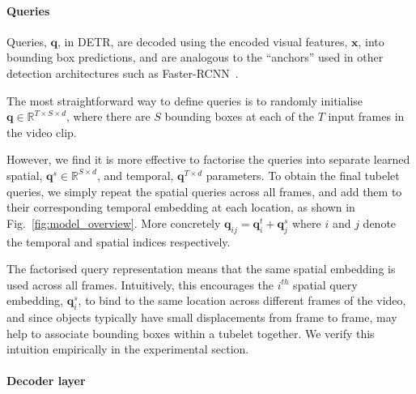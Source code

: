\documentclass[10pt,twocolumn,letterpaper]{article}
\def \paravspace {-0.7\baselineskip}
\begin{document}
\paragraph{Queries}
\label{sec:method_queries}

Queries, $\mathbf{q}$, in DETR, are decoded using the encoded visual features, $\mathbf{x}$, into bounding box predictions, and are analogous to the ``anchors'' used in other detection architectures such as Faster-RCNN~\cite{ren_neurips_2015}.

The most straightforward way to define queries is to randomly initialise $\mathbf{q} \in \mathbb{R}^{T \times S \times d}$, where there are $S$ bounding boxes at each of the $T$ input frames in the video clip.

However, we find it is more effective to factorise the queries into separate learned spatial, $\mathbf{q}^s \in \mathbb{R}^{S \times d}$, and temporal, $\mathbf{q}^{T \times d}$ parameters.
To obtain the final tubelet queries, we simply repeat the spatial queries across all frames, and add them to their corresponding temporal embedding at each location, as shown in Fig.~\ref{fig:model_overview}.
More concretely $\mathbf{q}_{ij} = \mathbf{q}^t_i + \mathbf{q}^s_j$ where $i$ and $j$ denote the temporal and spatial indices respectively.

The factorised query representation means that the same spatial embedding is used across all frames.
Intuitively, this encourages the $i^{th}$ spatial query embedding, $\mathbf{q}^s_i$, to bind to the same location across different frames of the video, and since objects typically have small displacements from frame to frame, may help to associate bounding boxes within a tubelet together. We verify this intuition empirically in the experimental section. 

\vspace{\paravspace}
\paragraph{Decoder layer}
\end{document}
